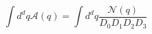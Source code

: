 \documentclass[10pt]{article}
\begin{document}
\[\int d^dq \mathcal{A}(q) = \int d^dq \frac{\mathcal{N}(q)}{D_0 D_1 D_2 D_3}\]
\end{document}
